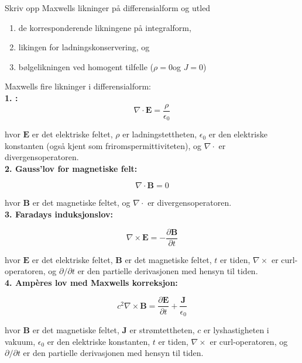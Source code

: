  \homeworkProblem{}
 Skriv opp Maxwells likninger på differensialform og utled

 \begin{enumerate}
    \item de korresponderende likningene på integralform,
    \item likingen for ladningskonservering, og 
    \item bølgelikningen ved homogent tilfelle ($\rho=0$og $J=0$)
 \end{enumerate}

Maxwells fire likninger i differensialform:
\\
\textbf{1. :}
\begin{equation*}
    \nabla \cdot \mathbf{E} = \frac{\rho}{\epsilon_0}
\end{equation*}

hvor $\mathbf{E}$ er det elektriske feltet, $\rho$ er ladningstettheten, $\epsilon_0$ er den elektriske konstanten (også kjent som friromspermittiviteten), og $\nabla \cdot$ er divergensoperatoren.
\\
\textbf{2. Gauss'lov for magnetiske felt:}

\begin{equation*}
    \nabla \cdot \mathbf{B} = 0
\end{equation*}

hvor $\mathbf{B}$ er det magnetiske feltet, og $\nabla \cdot$ er divergensoperatoren.
\\
\textbf{3. Faradays induksjonslov:}

\begin{equation*}
    \nabla \times \mathbf{E} = -\frac{\partial \mathbf{B}}{\partial t}
\end{equation*}

hvor $\mathbf{E}$ er det elektriske feltet, $\mathbf{B}$ er det magnetiske feltet, $t$ er tiden, $\nabla \times$ er curl-operatoren, og $\partial/\partial t$ er den partielle derivasjonen med hensyn til tiden.
\\
\textbf{4. Ampères lov med Maxwells korreksjon:}

\begin{equation*}
    c^{2} \nabla \times \mathbf{B}=\frac{\partial \mathbf{E}}{\partial t}+\frac{\mathbf{J}}{\epsilon_{0}}
\end{equation*}

hvor $\mathbf{B}$ er det magnetiske feltet, $\mathbf{J}$ er strømtettheten, $c$ er lyshastigheten i vakuum, $\epsilon_0$ er den elektriske konstanten, $t$ er tiden, $\nabla \times$ er curl-operatoren, og $\partial/\partial t$ er den partielle derivasjonen med hensyn til tiden.

